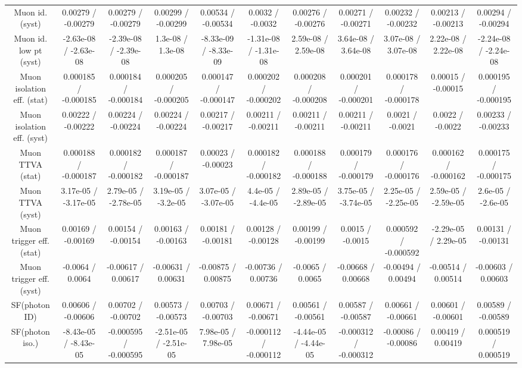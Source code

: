 \begin{table}[htbp]
\begin{center}
\begin{tabular}{|c|c|c|c|c|c|c|c|c|c|c|}
  Muon id. (syst) & 0.00279 / -0.00279 & 0.00279 / -0.00279 & 0.00299 / -0.00299 & 0.00534 / -0.00534 & 0.0032 / -0.0032 & 0.00276 / -0.00276 & 0.00271 / -0.00271 & 0.00232 / -0.00232 & 0.00213 / -0.00213 & 0.00294 / -0.00294 \\ 
  Muon id. low pt (syst) & -2.63e-08 / -2.63e-08 & -2.39e-08 / -2.39e-08 & 1.3e-08 / 1.3e-08 & -8.33e-09 / -8.33e-09 & -1.31e-08 / -1.31e-08 & 2.59e-08 / 2.59e-08 & 3.64e-08 / 3.64e-08 & 3.07e-08 / 3.07e-08 & 2.22e-08 / 2.22e-08 & -2.24e-08 / -2.24e-08 \\ 
  Muon isolation eff. (stat) & 0.000185 / -0.000185 & 0.000184 / -0.000184 & 0.000205 / -0.000205 & 0.000147 / -0.000147 & 0.000202 / -0.000202 & 0.000208 / -0.000208 & 0.000201 / -0.000201 & 0.000178 / -0.000178 & 0.00015 / -0.00015 & 0.000195 / -0.000195 \\ 
  Muon isolation eff. (syst) & 0.00222 / -0.00222 & 0.00224 / -0.00224 & 0.00224 / -0.00224 & 0.00217 / -0.00217 & 0.00211 / -0.00211 & 0.00211 / -0.00211 & 0.00211 / -0.00211 & 0.0021 / -0.0021 & 0.0022 / -0.0022 & 0.00233 / -0.00233 \\ 
  Muon TTVA (stat) & 0.000188 / -0.000187 & 0.000182 / -0.000182 & 0.000187 / -0.000187 & 0.00023 / -0.00023 & 0.000182 / -0.000182 & 0.000188 / -0.000188 & 0.000179 / -0.000179 & 0.000176 / -0.000176 & 0.000162 / -0.000162 & 0.000175 / -0.000175 \\ 
  Muon TTVA (syst) & 3.17e-05 / -3.17e-05 & 2.79e-05 / -2.78e-05 & 3.19e-05 / -3.2e-05 & 3.07e-05 / -3.07e-05 & 4.4e-05 / -4.4e-05 & 2.89e-05 / -2.89e-05 & 3.75e-05 / -3.74e-05 & 2.25e-05 / -2.25e-05 & 2.59e-05 / -2.59e-05 & 2.6e-05 / -2.6e-05 \\ 
  Muon trigger eff. (stat) & 0.00169 / -0.00169 & 0.00154 / -0.00154 & 0.00163 / -0.00163 & 0.00181 / -0.00181 & 0.00128 / -0.00128 & 0.00199 / -0.00199 & 0.0015 / -0.0015 & 0.000592 / -0.000592 & -2.29e-05 / 2.29e-05 & 0.00131 / -0.00131 \\ 
  Muon trigger eff. (syst) & -0.0064 / 0.0064 & -0.00617 / 0.00617 & -0.00631 / 0.00631 & -0.00875 / 0.00875 & -0.00736 / 0.00736 & -0.0065 / 0.0065 & -0.00668 / 0.00668 & -0.00494 / 0.00494 & -0.00514 / 0.00514 & -0.00603 / 0.00603 \\ 
  SF(photon ID) & 0.00606 / -0.00606 & 0.00702 / -0.00702 & 0.00573 / -0.00573 & 0.00703 / -0.00703 & 0.00671 / -0.00671 & 0.00561 / -0.00561 & 0.00587 / -0.00587 & 0.00661 / -0.00661 & 0.00601 / -0.00601 & 0.00589 / -0.00589 \\ 
  SF(photon iso.) & -8.43e-05 / -8.43e-05 & -0.000595 / -0.000595 & -2.51e-05 / -2.51e-05 & 7.98e-05 / 7.98e-05 & -0.000112 / -0.000112 & -4.44e-05 / -4.44e-05 & -0.000312 / -0.000312 & -0.00086 / -0.00086 & 0.00419 / 0.00419 & 0.000519 / 0.000519 \\ 

\end{tabular}
\end{center}
\end{table}
